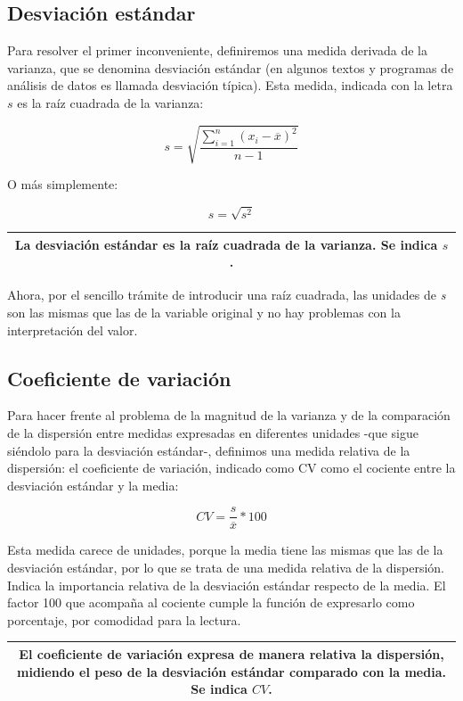 \documentclass[]{book}
\begin{document}
\hypertarget{desviaciuxf3n-estuxe1ndar}{%
\subsection{Desviación estándar}\label{desviaciuxf3n-estuxe1ndar}}

Para resolver el primer inconveniente, definiremos una medida derivada de la varianza, que se denomina desviación estándar (en algunos textos y programas de análisis de datos es llamada desviación típica). Esta medida, indicada con la letra \(s\) es la raíz cuadrada de la varianza:

\[s = \sqrt{\frac{\sum_{i = 1}^{n}\left( x_{i} - \overline{x} \right)^{2}}{n - 1}}\]

O más simplemente:

\[s = \sqrt{s^{2}}\]

\begin{longtable}[]{@{}c@{}}
\toprule
\endhead
La \textbf{desviación estándar} es la raíz cuadrada de la varianza. Se indica \(s\).\tabularnewline
\bottomrule
\end{longtable}

Ahora, por el sencillo trámite de introducir una raíz cuadrada, las
unidades de \emph{s} son las mismas que las de la variable original y no hay problemas con la interpretación del valor.

\hypertarget{coeficiente-de-variaciuxf3n}{%
\subsection{Coeficiente de variación}\label{coeficiente-de-variaciuxf3n}}

Para hacer frente al problema de la magnitud de la varianza y de la comparación de la dispersión entre medidas expresadas en diferentes unidades -que sigue siéndolo para la desviación estándar-, definimos una medida relativa de la dispersión: el coeficiente de variación, indicado como CV como el cociente entre la desviación estándar y la media:

\[CV=\frac{s}{\overline{x}}*100\]

Esta medida carece de unidades, porque la media tiene las mismas que las de la desviación estándar, por lo que se trata de una medida relativa de la dispersión. Indica la importancia relativa de la desviación estándar respecto de la media. El factor 100 que acompaña al cociente cumple la función de expresarlo como porcentaje, por comodidad para la lectura.

\begin{longtable}[]{@{}c@{}}
\toprule
\endhead
\begin{minipage}[t]{0.97\columnwidth}\centering
El \textbf{coeficiente de variación} expresa de manera relativa la dispersión, midiendo el peso de la desviación estándar comparado con la media. Se indica \(CV\).\strut
\end{minipage}\tabularnewline
\bottomrule
\end{longtable}
\end{document}
